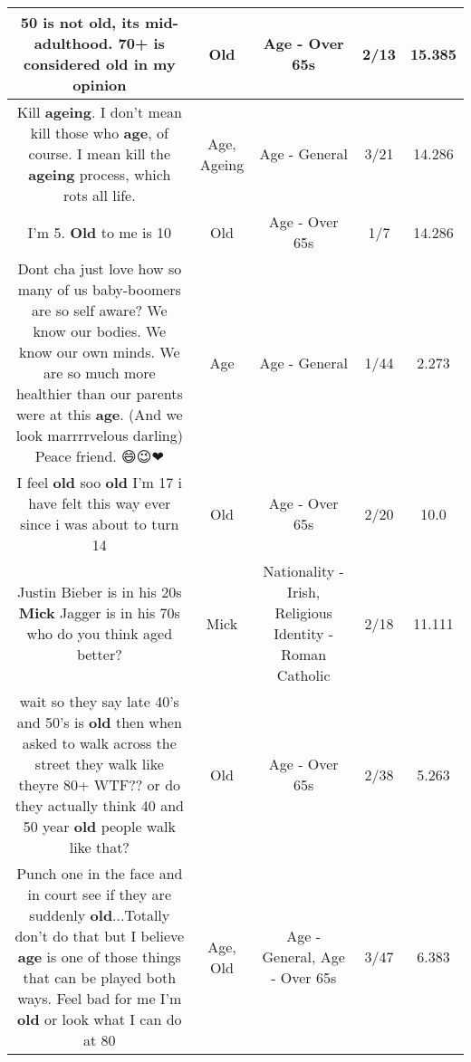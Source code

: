 \documentclass[11pt]{article}
\newlength\mylength
\begin{document}
\begin{center}
\begin{longtable}{|C{.65\mylength}|C{.30\mylength}|C{.12\mylength}|C{.12\mylength}|C{.12\mylength}|}
  \small 50 is not \textbf{old}, its mid-adulthood. 70+ is considered \textbf{old} in my opinion\normalsize   & Old & Age - Over 65s & 2/13 & 15.385 \\  \hline
  \small Kill \textbf{ageing}. I don't mean kill those who \textbf{age}, of course. I mean kill the \textbf{ageing} process, which rots all life.\normalsize   & Age, Ageing & Age - General & 3/21 & 14.286 \\  \hline
  \small I'm 5. \textbf{Old} to me is 10\normalsize   & Old & Age - Over 65s & 1/7 & 14.286 \\  \hline
  \small Dont cha just love how so many of us baby-boomers are so self aware? We know our bodies. We know our own minds. We are so much more healthier than our parents were at this \textbf{age}. (And we look marrrrvelous darling) Peace friend. 😄😉❤\normalsize   & Age & Age - General & 1/44 & 2.273 \\  \hline
  \small I feel \textbf{old} soo \textbf{old} I'm 17 i have felt this way ever since i was about to turn 14\normalsize   & Old & Age - Over 65s & 2/20 & 10.0 \\  \hline
  \small Justin Bieber is in his 20s \textbf{M\textbf{ick}} Jagger is in his 70s who do you think aged better?\normalsize   & Mick & Nationality - Irish, Religious Identity - Roman Catholic & 2/18 & 11.111 \\  \hline
  \small wait so they say late 40's and 50's is \textbf{old} then when asked to walk across the street they walk like theyre 80+ WTF?? or do they actually think 40 and 50 year \textbf{old} people walk like that?\normalsize   & Old & Age - Over 65s & 2/38 & 5.263 \\  \hline
  \small Punch one in the face and in court see if they are suddenly \textbf{old}...Totally don't do that but I believe \textbf{age} is one of those things that can be played both ways. Feel bad for me I'm \textbf{old} or look what I can do at 80\normalsize   & Age, Old & Age - General, Age - Over 65s & 3/47 & 6.383 \\  \hline

\end{longtable}
\end{center}
\end{document}
